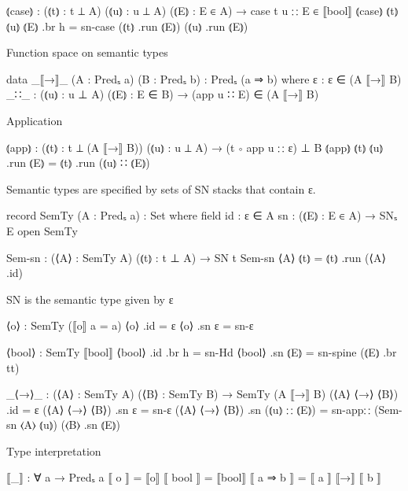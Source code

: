 \begin{code}
⦅case⦆ : (⦅t⦆ : t ⊥ A) (⦅u⦆ : u ⊥ A) (⦅E⦆ : E ∈ A) → case t u ∷ E ∈ ⟦bool⟧
⦅case⦆ ⦅t⦆ ⦅u⦆ ⦅E⦆ .br h = sn-case (⦅t⦆ .run ⦅E⦆) (⦅u⦆ .run ⦅E⦆)
\end{code}

Function space on semantic types

\begin{code}
data _⟦→⟧_ (A : Predₛ a) (B : Predₛ b) : Predₛ (a ⇒ b) where
  ε    : ε ∈ (A ⟦→⟧ B)
  _∷_  : (⦅u⦆ : u ⊥ A) (⦅E⦆ : E ∈ B) → (app u ∷ E) ∈ (A ⟦→⟧ B)
\end{code}

Application

\begin{code}
⦅app⦆ : (⦅t⦆ : t ⊥ (A ⟦→⟧ B)) (⦅u⦆ : u ⊥ A) → (t ∘ app u ∷ ε) ⊥ B
⦅app⦆ ⦅t⦆ ⦅u⦆ .run ⦅E⦆ = ⦅t⦆ .run (⦅u⦆ ∷ ⦅E⦆)
\end{code}


Semantic types are specified by sets of SN stacks that contain ε.

\begin{code}
record SemTy (A : Predₛ a) : Set where
  field
    id  : ε ∈ A
    sn  : (⦅E⦆ : E ∈ A) → SNₛ E
open SemTy

Sem-sn : (⟨A⟩ : SemTy A) (⦅t⦆ : t ⊥ A) → SN t
Sem-sn ⟨A⟩ ⦅t⦆ = ⦅t⦆ .run (⟨A⟩ .id)
\end{code}


SN is the semantic type given by {ε}

\begin{code}
⟨o⟩ : SemTy (⟦o⟧ {a = a})
⟨o⟩ .id    = ε
⟨o⟩ .sn ε  = sn-ε

⟨bool⟩ : SemTy ⟦bool⟧
⟨bool⟩ .id .br h  = sn-Hd
⟨bool⟩ .sn  ⦅E⦆    = sn-spine (⦅E⦆ .br tt)

_⟨→⟩_ : (⟨A⟩ : SemTy A) (⟨B⟩ : SemTy B) → SemTy (A ⟦→⟧ B)
(⟨A⟩ ⟨→⟩ ⟨B⟩) .id            = ε
(⟨A⟩ ⟨→⟩ ⟨B⟩) .sn ε          = sn-ε
(⟨A⟩ ⟨→⟩ ⟨B⟩) .sn (⦅u⦆ ∷ ⦅E⦆)  = sn-app∷ (Sem-sn ⟨A⟩ ⦅u⦆) (⟨B⟩ .sn ⦅E⦆)
\end{code}


Type interpretation

\begin{code}
⟦_⟧ : ∀ a → Predₛ a
⟦ o ⟧      = ⟦o⟧
⟦ bool ⟧   = ⟦bool⟧
⟦ a ⇒ b ⟧  = ⟦ a ⟧ ⟦→⟧ ⟦ b ⟧
\end{code}

